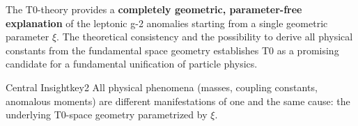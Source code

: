 \documentclass[12pt,a4paper]{article}
\newcommand{\xipar}{\xi}
\begin{document}
	The T0-theory provides a \textbf{completely geometric, parameter-free explanation} of the leptonic g-2 anomalies starting from a single geometric parameter $\xipar$. The theoretical consistency and the possibility to derive all physical constants from the fundamental space geometry establishes T0 as a promising candidate for a fundamental unification of particle physics.
	
	\begin{keyresult}{Central Insight}{key2}
		All physical phenomena (masses, coupling constants, anomalous moments) are different manifestations of one and the same cause: the underlying T0-space geometry parametrized by $\xipar$.
	\end{keyresult}
	
\end{document}
